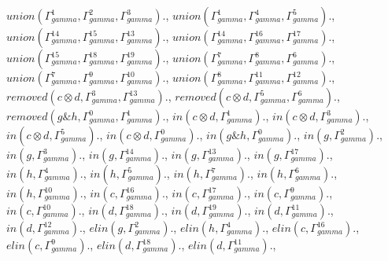 \documentclass[a4paper, 11pt]{article}
\begin{document}
$union(\Gamma_{gamma}^{1}, \Gamma_{gamma}^{2}, \Gamma_{gamma}^{3}).$, $union(\Gamma_{gamma}^{1}, \Gamma_{gamma}^{4}, \Gamma_{gamma}^{5}).$, $union(\Gamma_{gamma}^{14}, \Gamma_{gamma}^{15}, \Gamma_{gamma}^{13}).$, $union(\Gamma_{gamma}^{14}, \Gamma_{gamma}^{16}, \Gamma_{gamma}^{17}).$, $union(\Gamma_{gamma}^{15}, \Gamma_{gamma}^{18}, \Gamma_{gamma}^{19}).$, $union(\Gamma_{gamma}^{7}, \Gamma_{gamma}^{8}, \Gamma_{gamma}^{6}).$, $union(\Gamma_{gamma}^{7}, \Gamma_{gamma}^{9}, \Gamma_{gamma}^{10}).$, $union(\Gamma_{gamma}^{8}, \Gamma_{gamma}^{11}, \Gamma_{gamma}^{12}).$, $removed(c \otimes d, \Gamma_{gamma}^{3}, \Gamma_{gamma}^{13}).$, $removed(c \otimes d, \Gamma_{gamma}^{5}, \Gamma_{gamma}^{6}).$, $removed(g \binampersand h, \Gamma_{gamma}^{0}, \Gamma_{gamma}^{1}).$, $in(c \otimes d, \Gamma_{gamma}^{1}).$, $in(c \otimes d, \Gamma_{gamma}^{3}).$, $in(c \otimes d, \Gamma_{gamma}^{5}).$, $in(c \otimes d, \Gamma_{gamma}^{0}).$, $in(g \binampersand h, \Gamma_{gamma}^{0}).$, $in(g, \Gamma_{gamma}^{2}).$, $in(g, \Gamma_{gamma}^{3}).$, $in(g, \Gamma_{gamma}^{14}).$, $in(g, \Gamma_{gamma}^{13}).$, $in(g, \Gamma_{gamma}^{17}).$, $in(h, \Gamma_{gamma}^{4}).$, $in(h, \Gamma_{gamma}^{5}).$, $in(h, \Gamma_{gamma}^{7}).$, $in(h, \Gamma_{gamma}^{6}).$, $in(h, \Gamma_{gamma}^{10}).$, $in(c, \Gamma_{gamma}^{16}).$, $in(c, \Gamma_{gamma}^{17}).$, $in(c, \Gamma_{gamma}^{9}).$, $in(c, \Gamma_{gamma}^{10}).$, $in(d, \Gamma_{gamma}^{18}).$, $in(d, \Gamma_{gamma}^{19}).$, $in(d, \Gamma_{gamma}^{11}).$, $in(d, \Gamma_{gamma}^{12}).$, $elin(g, \Gamma_{gamma}^{2}).$, $elin(h, \Gamma_{gamma}^{4}).$, $elin(c, \Gamma_{gamma}^{16}).$, $elin(c, \Gamma_{gamma}^{9}).$, $elin(d, \Gamma_{gamma}^{18}).$, $elin(d, \Gamma_{gamma}^{11}).$, 
\end{document}
